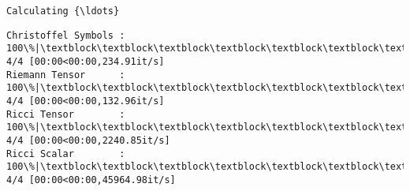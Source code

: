 \documentclass[11pt]{article}
\newcommand{\prompt}[4]{
        {\ttfamily\llap{{\color{#2}[#3]:\hspace{3pt}#4}}\vspace{-\baselineskip}}
    }
\begin{document}
    \begin{Verbatim}[commandchars=\\\{\}]
Calculating {\ldots}
    \end{Verbatim}

    \begin{Verbatim}[commandchars=\\\{\}]
Christoffel Symbols : 100\%|\textblock\textblock\textblock\textblock\textblock\textblock\textblock\textblock\textblock\textblock\textblock\textblock\textblock\textblock\textblock\textblock\textblock\textblock\textblock\textblock\textblock\textblock\textblock\textblock\textblock\textblock\textblock\textblock\textblock\textblock\textblock\textblock\textblock\textblock| 4/4 [00:00<00:00,234.91it/s]
Riemann Tensor      : 100\%|\textblock\textblock\textblock\textblock\textblock\textblock\textblock\textblock\textblock\textblock\textblock\textblock\textblock\textblock\textblock\textblock\textblock\textblock\textblock\textblock\textblock\textblock\textblock\textblock\textblock\textblock\textblock\textblock\textblock\textblock\textblock\textblock\textblock\textblock| 4/4 [00:00<00:00,132.96it/s]
Ricci Tensor        : 100\%|\textblock\textblock\textblock\textblock\textblock\textblock\textblock\textblock\textblock\textblock\textblock\textblock\textblock\textblock\textblock\textblock\textblock\textblock\textblock\textblock\textblock\textblock\textblock\textblock\textblock\textblock\textblock\textblock\textblock\textblock\textblock\textblock\textblock| 4/4 [00:00<00:00,2240.85it/s]
Ricci Scalar        : 100\%|\textblock\textblock\textblock\textblock\textblock\textblock\textblock\textblock\textblock\textblock\textblock\textblock\textblock\textblock\textblock\textblock\textblock\textblock\textblock\textblock\textblock\textblock\textblock\textblock\textblock\textblock\textblock\textblock\textblock\textblock\textblock\textblock| 4/4 [00:00<00:00,45964.98it/s]
    \end{Verbatim}
 
            
\prompt{Out}{outcolor}{15}{}
    
\end{document}
